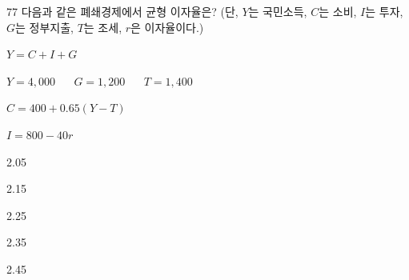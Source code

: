 \begin{question}{77}
다음과 같은 폐쇄경제에서 균형 이자율은? (단, $Y$는 국민소득, $C$는 소비, $I$는 투자, $G$는 정부지출, $T$는 조세, $r$은 이자율이다.)
\begin{framedtext}
$Y=C+I+G$ \par
$Y=4{,}000$ $\quad$ $G=1{,}200$ $\quad$ $T=1{,}400$ \par
$C=400+0.65(Y-T)$ \par
$I=800-40r$ \par
\end{framedtext}
\begin{choices}
  \item 2.05
  \item 2.15
  \item 2.25
  \item 2.35
  \item 2.45
\end{choices}
\end{question}
